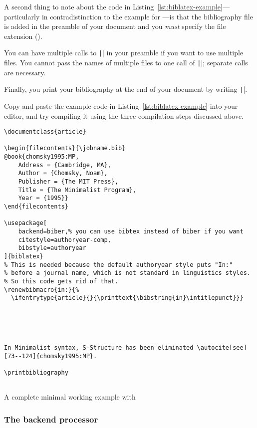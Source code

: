 A second thing to note about the code in Listing~\ref{lst:biblatex-example}---particularly in contradistinction to the example for ---is that the bibliography file is added in the preamble of your document and you \emph{must} specify the file extension ().

You can have multiple calls to \texttt|| in your preamble if you want to use multiple  files.
You cannot pass the names of multiple  files to one call of \texttt||; separate calls are necessary.

Finally, you print your bibliography at the end of your document by writing \texttt|\printbibliography|.

Copy and paste the example code in Listing~\ref{lst:biblatex-example} into your editor, and try compiling it using the three compilation steps discussed above.

\begin{listing}[htbp]
	\centering
	\begin{verbatim}
\documentclass{article}

\begin{filecontents}{\jobname.bib}
@book{chomsky1995:MP,
    Address = {Cambridge, MA},
    Author = {Chomsky, Noam},
    Publisher = {The MIT Press},
    Title = {The Minimalist Program},
    Year = {1995}}
\end{filecontents}

\usepackage[
    backend=biber,% you can use bibtex instead of biber if you want
    citestyle=authoryear-comp,
    bibstyle=authoryear
]{biblatex}
% This is needed because the default authoryear style puts "In:"
% before a journal name, which is not standard in linguistics styles.
% So this code gets rid of that.
\renewbibmacro{in:}{%
  \ifentrytype{article}{}{\printtext{\bibstring{in}\intitlepunct}}}





In Minimalist syntax, S-Structure has been eliminated \autocite[see][73--124]{chomsky1995:MP}.

\printbibliography


	\end{verbatim}
	\caption{A complete minimal working example with }
	\label{lst:biblatex-example}
\end{listing}

\subsubsection{The backend processor}
\label{subsubsec:the-backend-processor}

